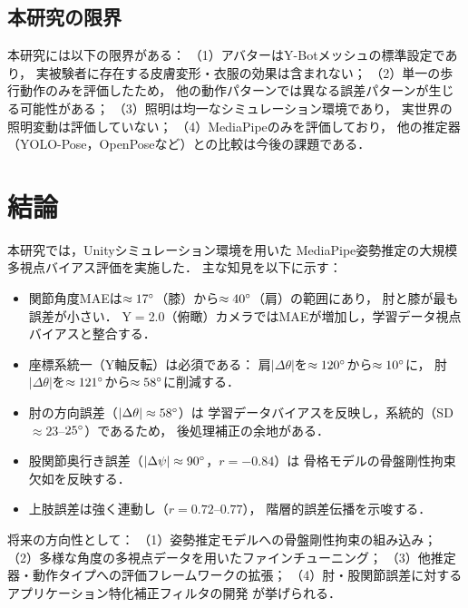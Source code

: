 \documentclass[twocolumn]{article}
\begin{document}
\subsection{本研究の限界}

本研究には以下の限界がある：
（1）アバターはY-Botメッシュの標準設定であり，
実被験者に存在する皮膚変形・衣服の効果は含まれない；
（2）単一の歩行動作のみを評価したため，
他の動作パターンでは異なる誤差パターンが生じる可能性がある；
（3）照明は均一なシミュレーション環境であり，
実世界の照明変動は評価していない；
（4）MediaPipeのみを評価しており，
他の推定器（YOLO-Pose，OpenPoseなど）との比較は今後の課題である．

\section{結論}

本研究では，Unityシミュレーション環境を用いた
MediaPipe姿勢推定の大規模多視点バイアス評価を実施した．
主な知見を以下に示す：

\begin{itemize}\itemsep0pt
  \item 関節角度MAEは$\approx17\degree{}$（膝）から$\approx40\degree{}$（肩）の範囲にあり，
        肘と膝が最も誤差が小さい．
        Y$=$2.0（俯瞰）カメラではMAEが増加し，学習データ視点バイアスと整合する．
  \item 座標系統一（Y軸反転）は必須である：
        肩$|\Delta\theta|$を$\approx120\degree{}$から$\approx10\degree{}$に，
        肘$|\Delta\theta|$を$\approx121\degree{}$から$\approx58\degree{}$に削減する．
  \item 肘の方向誤差（$|\Delta\theta|\approx58\degree{}$）は
        学習データバイアスを反映し，系統的（SD $\approx23$--$25\degree{}$）であるため，
        後処理補正の余地がある．
  \item 股関節奥行き誤差（$|\Delta\psi|\approx90\degree{}$，$r=-0.84$）は
        骨格モデルの骨盤剛性拘束欠如を反映する．
  \item 上肢誤差は強く連動し（$r=0.72$--$0.77$），
        階層的誤差伝播を示唆する．
\end{itemize}

将来の方向性として：
（1）姿勢推定モデルへの骨盤剛性拘束の組み込み；
（2）多様な角度の多視点データを用いたファインチューニング；
（3）他推定器・動作タイプへの評価フレームワークの拡張；
（4）肘・股関節誤差に対するアプリケーション特化補正フィルタの開発
が挙げられる．
\end{document}
